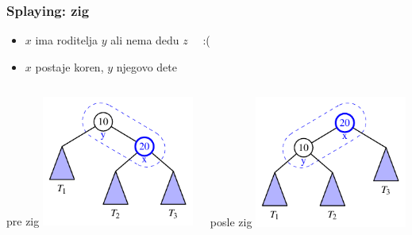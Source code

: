 \documentclass[compress]{beamer}
\begin{document}
\begin{frame}[fragile]
  \frametitle{Splaying: zig}
  \begin{itemize}
    \item $x$ ima roditelja $y$ ali nema dedu $z$ \ \ :(
    \item $x$ postaje koren, $y$ njegovo dete
  \end{itemize}
  \begin{columns}
    \begin{column}[t]{6cm}
      \begin{center}
        pre zig
        \includegraphics[width=5cm]{asp-11-pic20a.pdf}
      \end{center}
    \end{column}  
    \begin{column}[t]{6cm}
      \begin{center}
        posle zig
        \includegraphics[width=5cm]{asp-11-pic20b.pdf}
      \end{center}
    \end{column}  
  \end{columns}
\end{frame}
\end{document}
